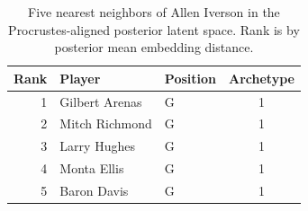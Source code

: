 \begin{table}[htbp]
  \centering\small
  \begin{tabular}{rllc}
    \toprule
    Rank & Player & Position & Archetype \\
    \midrule
    1 & Gilbert Arenas & G & 1 \\
    2 & Mitch Richmond & G & 1 \\
    3 & Larry Hughes & G & 1 \\
    4 & Monta Ellis & G & 1 \\
    5 & Baron Davis & G & 1 \\
    \bottomrule
  \end{tabular}
  \caption{Five nearest neighbors of Allen Iverson in the Procrustes-aligned posterior latent space. Rank is by posterior mean embedding distance.}
  \label{tab:Allen_Iverson_neighbors}
\end{table}

